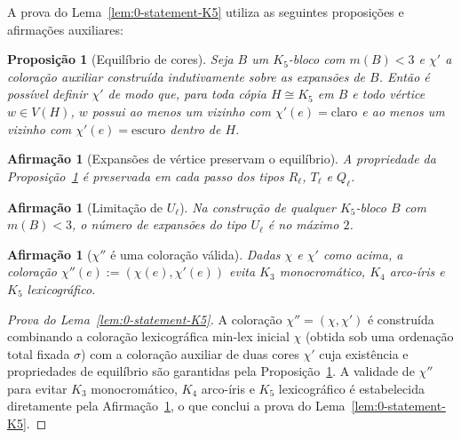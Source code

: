 \documentclass[reqno, 12pt]{amsart}
\numberwithin{equation}{section}
\theoremstyle{plain}
\newtheorem{proposition}[theorem]{Proposição}
\newtheorem{afirmacao}[theorem]{Afirmação}
\theoremstyle{definition}
\newcommand{\maxdens}{m}
\begin{document}
A prova do Lema~\ref{lem:0-statement-K5} utiliza as seguintes proposições e afirmações auxiliares:

\begin{proposition}[Equilíbrio de cores]
    \label{prop:equilibrio}
    Seja $B$ um $K_5$-bloco com $\maxdens(B) < 3$ e $\chi'$ a coloração auxiliar construída indutivamente sobre as expansões de $B$. Então é possível definir $\chi'$ de modo que, para toda cópia $H \cong K_5$ em $B$ e todo vértice $w \in V(H)$, $w$ possui ao menos um vizinho com $\chi'(e) = \text{claro}$ e ao menos um vizinho com $\chi'(e) = \text{escuro}$ dentro de $H$.
\end{proposition}

\begin{afirmacao}[Expansões de vértice preservam o equilíbrio]
    \label{afirm:vertex-exp}
    A propriedade da Proposição~\ref{prop:equilibrio} é preservada em cada passo dos tipos $R_\ell$, $T_\ell$ e $Q_\ell$.
\end{afirmacao}

\begin{afirmacao}[Limitação de $U_\ell$]
    \label{afirm:ulimit}
    Na construção de qualquer $K_5$-bloco $B$ com $\maxdens(B) < 3$, o número de expansões do tipo $U_\ell$ é no máximo $2$.
\end{afirmacao}

\begin{afirmacao}[$\chi''$ é uma coloração válida]
    \label{afirm:chipp}
    Dadas $\chi$ e $\chi'$ como acima, a coloração $\chi''(e) := (\chi(e), \chi'(e))$ evita $K_3$ monocromático, $K_4$ arco-íris e $K_5$ lexicográfico.
\end{afirmacao}


\begin{proof}[Prova do Lema~\ref{lem:0-statement-K5}]
    A coloração $\chi'' = (\chi, \chi')$ é construída combinando a coloração lexicográfica min-lex inicial $\chi$ (obtida sob uma ordenação total fixada $\sigma$) com a coloração auxiliar de duas cores $\chi'$ cuja existência e propriedades de equilíbrio são garantidas pela Proposição~\ref{prop:equilibrio}. A validade de $\chi''$ para evitar $K_3$ monocromático, $K_4$ arco-íris e $K_5$ lexicográfico é estabelecida diretamente pela Afirmação~\ref{afirm:chipp}, o que conclui a prova do Lema~\ref{lem:0-statement-K5}.
\end{proof}
\end{document}
